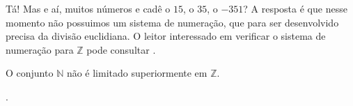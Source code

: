 \documentclass[../main.tex]{subfiles}
\begin{document}
Tá! Mas e aí, muitos números e cadê o $15$, o $35$, o $-351$? A resposta é que nesse momento não possuimos um sistema de numeração, que para ser desenvolvido precisa da divisão euclidiana. O leitor interessado em verificar o sistema de numeração para $\mathbb{Z}$ pode consultar \cite{hefez-algebra}.

\begin{teo}\label{int-teo-ilimitadoSuperiormente}
    O conjunto $\mathbb{N}$ não é limitado superiormente em $\mathbb{Z}$.
\end{teo}
\begin{dem}
    .
\end{dem}
\end{document}
